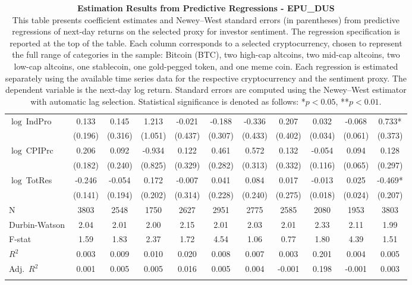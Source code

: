 \begin{table}[ht]
\begin{tabular}{l *{10}{c}}
\addlinespace
$\log\ $IndPro & 0.133 & 0.145 & 1.213 & -0.021 & -0.188 & -0.336 & 0.207 & 0.032 & -0.068 & 0.733* \\
 & (0.196) & (0.316) & (1.051) & (0.437) & (0.307) & (0.433) & (0.402) & (0.034) & (0.061) & (0.373) \\
\addlinespace
$\log\ $CPIPrc & 0.206 & 0.092 & -0.934 & 0.122 & 0.461 & 0.572 & 0.132 & -0.054 & 0.094 & 0.128 \\
 & (0.182) & (0.240) & (0.825) & (0.329) & (0.282) & (0.313) & (0.332) & (0.116) & (0.065) & (0.297) \\
\addlinespace
$\log\ $TotRes & -0.246 & -0.054 & 0.172 & -0.007 & 0.041 & 0.084 & 0.017 & -0.013 & 0.025 & -0.469* \\
 & (0.141) & (0.194) & (0.202) & (0.314) & (0.228) & (0.240) & (0.275) & (0.018) & (0.024) & (0.207) \\
\addlinespace
\midrule
N & 3803 & 2548 & 1750 & 2627 & 2951 & 2775 & 2585 & 2080 & 1953 & 3803 \\
Durbin-Watson & 2.04 & 2.01 & 2.00 & 2.15 & 2.01 & 2.03 & 2.01 & 2.33 & 2.11 & 1.99 \\
F-stat & 1.59 & 1.83 & 2.37 & 1.72 & 4.54 & 1.06 & 0.77 & 1.80 & 4.39 & 1.51 \\
\(R^2\) & 0.003 & 0.009 & 0.010 & 0.020 & 0.008 & 0.007 & 0.003 & 0.201 & 0.004 & 0.005 \\
Adj.\ \(R^2\) & 0.001 & 0.005 & 0.005 & 0.016 & 0.005 & 0.004 & -0.001 & 0.198 & -0.001 & 0.003 \\
\addlinespace
\midrule
\multicolumn{11}{c}{Specification tested: $R_{i,t+1} = \alpha_i + \beta_{sent} S_t + \phi R_{i,t} + \theta B_{i,t} + \gamma M_t + \varepsilon_{i,t+1}$}\\
\bottomrule
\end{tabular}
\caption{\textbf{Estimation Results from Predictive Regressions - EPU_DUS} \\
This table presents coefficient estimates and Newey--West standard errors (in parentheses) from predictive regressions of next-day returns on the selected proxy for investor sentiment. The regression specification is reported at the top of the table. Each column corresponds to a selected cryptocurrency, chosen to represent the full range of categories in the sample: Bitcoin (BTC), two high-cap altcoins, two mid-cap altcoins, two low-cap altcoins, one stablecoin, one gold-pegged token, and one meme coin. Each regression is estimated separately using the available time series data for the respective cryptocurrency and the sentiment proxy. The dependent variable is the next-day log return. Standard errors are computed using the Newey--West estimator with automatic lag selection. Statistical significance is denoted as follows: *$p<0.05$, **$p<0.01$.}
\label{tab:epu_dus_result_h1}
\end{table}